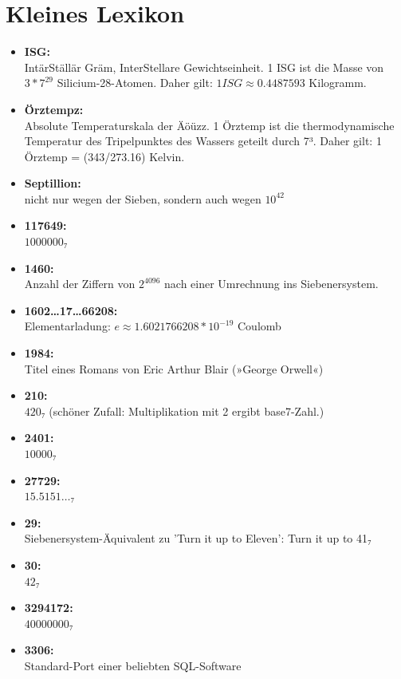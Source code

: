 \begin{enumerate}
\end{enumerate}


\chapter{Kleines Lexikon}

\begin{itemize}
    \item \textbf{ISG:}\\ IntärStällär Gräm, InterStellare Gewichtseinheit. 1 ISG ist die Masse von $3*7^{29}$ Silicium-28-Atomen. Daher gilt: $1 ISG ≈ 0.4487593$ Kilogramm.
    \item \textbf{Örztempz:}\\ Absolute Temperaturskala der Äöüzz. 1 Örztemp ist die thermodynamische Temperatur des Tripelpunktes des Wassers geteilt durch 7³. Daher gilt: 1 Örztemp = (343/273.16) Kelvin.
    \item \textbf{Septillion:}\\ nicht nur wegen der Sieben, sondern auch wegen $10^{42}$
    \item \textbf{117649:}\\ $1000000₇$
    \item \textbf{1460:}\\ Anzahl der Ziffern von $2^{4096}$ nach einer Umrechnung ins Siebenersystem.
    \item \textbf{1602…17…66208:}\\ Elementarladung: $e ≈ 1.6021766208*10^{-19}$ Coulomb
    \item \textbf{1984:}\\ Titel eines Romans von Eric Arthur Blair (»George Orwell«)
    \item \textbf{210:}\\ $420₇$ (schöner Zufall: Multiplikation mit 2 ergibt base7-Zahl.)
    \item \textbf{2401:}\\ $10000₇$
    \item \textbf{27729:}\\ $15.5151…₇$
    \item \textbf{29:}\\ Siebenersystem-Äquivalent zu 'Turn it up to Eleven': Turn it up to 41₇
    \item \textbf{30:}\\ $42₇$
    \item \textbf{3294172:}\\ $40000000₇$
    \item \textbf{3306:}\\ Standard-Port einer beliebten SQL-Software

\end{itemize}
